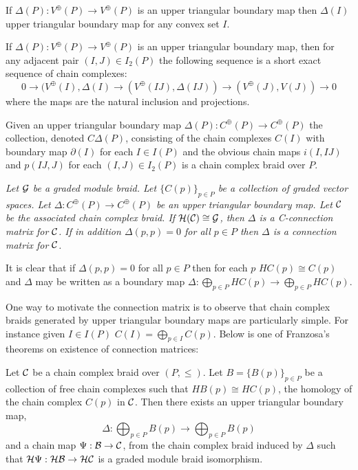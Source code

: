 \begin{prop}
If $\Delta(P):V^\oplus(P)\to V^\oplus(P)$ is an upper triangular boundary map then $\Delta(I)$ upper triangular boundary map for any convex set $I$.   
\end{prop}

\begin{prop}\label{prop:fran:3.3}
If $\Delta(P):V^\oplus(P)\to V^\oplus(P)$ is an upper triangular boundary map, then for any adjacent pair $(I,J)\in I_2(P)$ the following sequence is a short exact sequence of chain complexes: $$0\to (V^\oplus(I),\Delta(I)\to (V^\oplus(IJ),\Delta(IJ))\to (V^\oplus(J),V(J))\to 0$$ where the maps are the natural inclusion and projections.
\end{prop}

\begin{prop}
Given an upper triangular boundary map $\Delta(P):C^\oplus(P)\to C^\oplus(P)$ the collection, denoted $C\Delta(P)$, consisting of the chain complexes $C(I)$ with boundary map $\partial(I)$ for each $I\in I(P)$ and the obvious chain maps $i(I,IJ)$ and $p(IJ,J)$ for each $(I,J)\in I_2(P)$ is a chain complex braid over $P$.
\end{prop}






\begin{defn}
{\em
Let ${\mathcal G}$ be a graded module braid.  Let $\{C(p)\}_{p\in P}$ be a collection of graded vector spaces.  Let $\Delta:C^\oplus(P)\to C^\oplus(P)$ be an upper triangular boundary map.  Let ${\mathcal C}$ be the associated chain complex braid.  If ${\mathcal H}({\mathcal C})\cong {\mathcal G}$, then $\Delta$ is a {\em C-connection matrix} for ${\mathcal C}$.  If in addition $\Delta(p,p)=0$ for all $p\in P$ then $\Delta$ is a {\em connection matrix} for ${\mathcal C}$.
}
\end{defn}

It is clear that if $\Delta(p,p)=0$ for all $p\in P$ then for each $p$ $HC(p)\cong C(p)$ and $\Delta$ may be written as a boundary map $\Delta:\bigoplus_{p\in P} HC(p)\to \bigoplus_{p\in P} HC(p)$.

One way to motivate the connection matrix is to observe that chain complex braids generated by upper triangular boundary maps are particularly simple.  For instance given $I\in I(P)$ $C(I) = \bigoplus_{p\in I} C(p)$.  Below is one of Franzosa's theorems on existence of connection matrices:

\begin{thm}
Let ${\mathcal C}$ be a chain complex braid over $(P,\leq)$.  Let $B=\{B(p)\}_{p\in P}$ be a collection of free chain complexes such that $HB(p) \cong HC(p)$, the homology of the chain complex $C(p)$ in ${\mathcal C}$.  Then there exists an upper triangular boundary map, $$\Delta:\bigoplus_{p\in P} B(p)\to \bigoplus_{p\in P}B(p)$$ and a chain map $\Psi:{\mathcal B}\to {\mathcal C}$, from the chain complex braid induced by $\Delta$ such that ${\mathcal H}\Psi:{\mathcal H}{\mathcal B}\to {\mathcal H}{\mathcal C}$ is a graded module braid isomorphism.
\end{thm}

